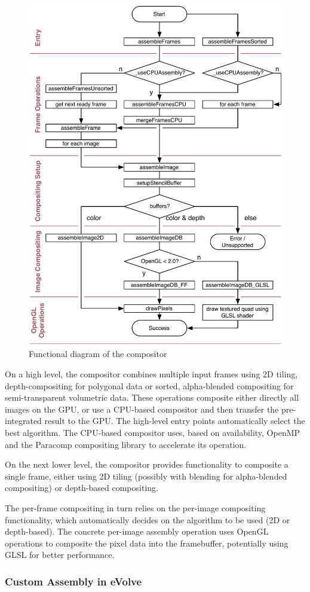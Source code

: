 \documentclass[10pt,a4]{scrartcl}
\begin{document}
\begin{figure}
  \includegraphics[width=.618\textwidth]{images/compositor.pdf}
  {\caption{\label{fCompositor}Functional diagram of the compositor}}
\end{figure}
On a high level, the compositor combines multiple input frames using 2D
tiling, depth-compositing for polygonal data or sorted, alpha-blended
compositing for semi-transparent volumetric data. These operations
composite either directly all images on the GPU, or use a CPU-based
compositor and then transfer the pre-integrated result to the GPU. The
high-level entry points automatically select the best algorithm. The
CPU-based compositor uses, based on availability, OpenMP and the
Paracomp compositing library to accelerate its operation.

On the next lower level, the compositor provides functionality to
composite a single frame, either using 2D tiling (possibly with blending
for alpha-blended compositing) or depth-based compositing. 

The per-frame compositing in turn relies on the per-image compositing
functionality, which automatically decides on the algorithm to be used
(2D or depth-based). The concrete per-image assembly operation uses
OpenGL operations to composite the pixel data into the framebuffer,
potentially using GLSL for better performance.


\subsubsection{Custom Assembly in eVolve}
\end{document}
